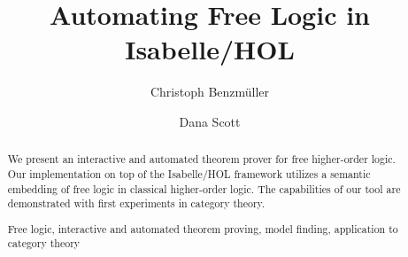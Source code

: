 \documentclass[runningheads,a4paper]{llncs}
\newcommand{\keywords}[1]{\par\addvspace\baselineskip
\noindent\keywordname\enspace\ignorespaces#1}
\begin{document}
\mainmatter


\title{Automating Free Logic in Isabelle/HOL}  %
\author{Christoph Benzm\"uller \and  Dana Scott}
\maketitle

\begin{abstract}
We present an interactive and automated theorem prover for free higher-order
logic. Our implementation on top of the Isabelle/HOL framework utilizes a semantic embedding of 
free logic in classical higher-order logic.
The capabilities of our tool are demonstrated with first experiments
in category theory.
\keywords{Free logic, interactive and automated theorem proving, model
  finding, application to category theory}
\end{abstract}


\end{document}
